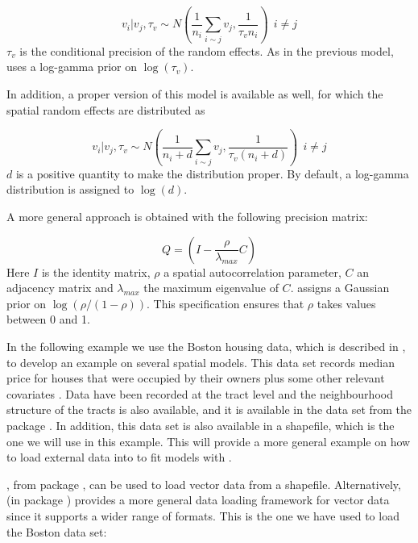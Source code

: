 \documentclass[article]{jss}
\begin{document}
\begin{equation}
v_i|v_j,\tau_v \sim  N( \frac{1}{n_i}\sum_{i\sim j} v_j, \frac{1}{\tau_vn_i})\ \  i\neq j
\end{equation}
\noindent
$\tau_v$ is the conditional precision of the random effects. As in the previous
model,  uses a log-gamma prior on $\log(\tau_v)$.

In addition, a proper version of this model is available as well,
for which the spatial random effects are distributed as

\begin{equation}
v_i|v_j,\tau_v \sim  N( \frac{1}{n_i+d}\sum_{i\sim j} v_j, \frac{1}{\tau_v(n_i+d)})\ \ i\neq j
\end{equation}
\noindent
$d$ is a positive quantity to make the distribution proper. By default,
a log-gamma distribution is assigned to $\log(d)$.

A more general approach is obtained  with the following precision
matrix:

\begin{equation}
Q = (I - \frac{\rho}{\lambda_{max}}C)
\end{equation}
\noindent
Here $I$ is the identity matrix, $\rho$ a spatial autocorrelation parameter,
$C$ an adjacency matrix and $\lambda_{max}$ the maximum eigenvalue of $C$.
 assigns a Gaussian prior on $\log(\rho/(1-\rho))$.
This specification ensures that $\rho$ takes values between 0 and 1.

In the following example we use the Boston housing data, which is described in
\citet{HarrisonRubinfeld:1978}, to develop an example on several spatial
models.  This data set  records median price for houses that were occupied by
their owners plus some other relevant covariates \citep[see,][for
details]{HarrisonRubinfeld:1978,pace+gilley:97}.
Data have been recorded at the tract level
and the neighbourhood structure of the tracts is also available, and it is
available in the  data set from the  package
 \citep{spdep:2013}. In addition, this data set is also available in
a shapefile, which is the one we will use in this example. This will provide a 
more general example on how to load external
data into  to fit models with .

, from package , can be used to load 
vector data from a shapefile. Alternatively,  (in package
) provides a more general data loading framework for vector data
since it supports a wider range of formats. This is the one we have used to
load the Boston data set:
\end{document}
